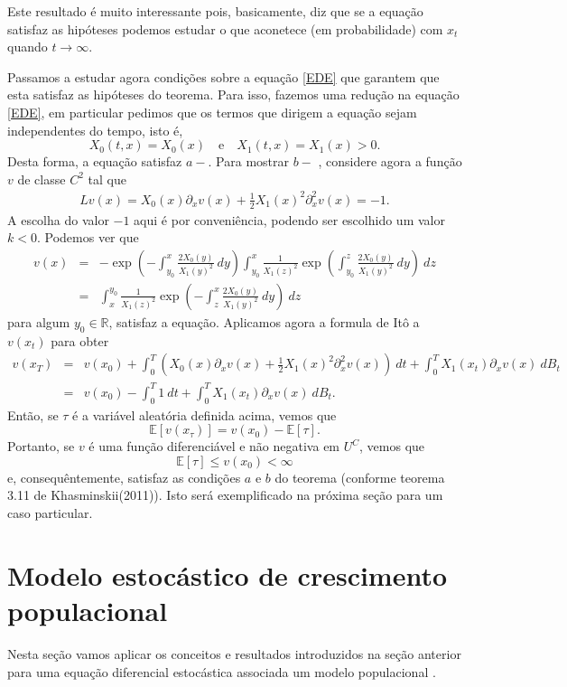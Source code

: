 \documentclass[12pt]{article}
\newcommand{\mr }{ \mathbb{R}}
\begin{document}
Este resultado é muito interessante pois, basicamente, diz que se a equação satisfaz as hipóteses podemos estudar o que aconetece (em probabilidade) com $x_t$ quando $t\to\infty$. 

Passamos a estudar agora condições sobre a equação \ref{EDE} que garantem que  esta satisfaz as hipóteses do teorema. Para isso, fazemos uma redução na equação \ref{EDE}, em particular pedimos que os termos que dirigem a equação sejam independentes do tempo, isto é, 
\[
X_0(t,x)=X_0(x)\quad \textrm{e}\quad X_1(t,x)=X_1(x)>0.
\] Desta forma, a equação satisfaz $a-$. Para mostrar $b-$ , considere agora a função $v$ de classe $C^2$ tal que 
\begin{eqnarray*}
Lv(x)=X_0(x)\partial_xv(x)+\frac{1}{2}X_1(x)^2\partial_x^2v(x)=-1.
\end{eqnarray*}
A escolha do valor $-1$ aqui é por conveniência, podendo ser escolhido um valor $k<0$.
Podemos ver que 
\begin{eqnarray*}
v(x)&=&-\exp\left(-\int^x_{y_0} \frac{2X_0(y)}{X_1(y)^2}~dy\right)\int^x_{y_0} \frac{1}{X_1(z)^2}\exp\left(\int^z_{y_0}  \frac{2X_0(y)}{X_1(y)^2}~dy\right)~dz\\
&=& \int^{y_0}_x \frac{1}{X_1(z)^2}\exp\left(-\int_z^x  \frac{2X_0(y)}{X_1(y)^2}~dy\right)~dz
\end{eqnarray*}
para algum $y_0\in \mr$, satisfaz a equação. Aplicamos agora a formula de Itô a $v(x_t)$ para obter 
\begin{eqnarray*}
v(x_T)&=&v(x_0)+\int_0^T\left(X_0(x)\partial_xv(x)+\frac{1}{2}X_1(x)^2\partial_x^2v(x)\right)~dt+\int_0^TX_1(x_t)\partial_xv(x)~dB_t\\
&=&v(x_0)-\int_0^T1~dt+\int_0^TX_1(x_t)\partial_xv(x)~dB_t.
\end{eqnarray*}
Então, se $\tau$ é a variável aleatória definida acima, vemos que 
\[
\mathbb{E}[v(x_{\tau})]=v(x_0)-\mathbb{E}[\tau].
\]
Portanto, se $v$ é uma função diferenciável e não negativa em $U^C$, vemos que 
\[\mathbb{E}[\tau]\leq v(x_0)<\infty\] e, consequêntemente, satisfaz as condições $a$ e $b$ do teorema (conforme teorema 3.11  de Khasminskii(2011)). Isto será exemplificado na próxima seção para um caso particular.  


\section{Modelo estocástico de crescimento populacional}

Nesta seção vamos aplicar os conceitos e resultados introduzidos na seção anterior para uma equação diferencial estocástica associada um modelo populacional . 
\end{document}
